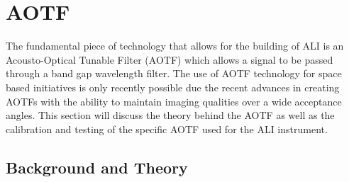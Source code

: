\section{AOTF}

The fundamental piece of technology that allows for the building of ALI is an Acousto-Optical Tunable Filter (AOTF) which allows a signal to be passed through a band gap wavelength filter. The use of AOTF technology for space based initiatives is only recently possible due the recent advances in creating AOTFs with the ability to maintain imaging qualities over a wide acceptance angles. This section will discuss the theory behind the AOTF as well as the calibration and testing of the specific AOTF used for the ALI instrument.

\subsection{Background and Theory}


